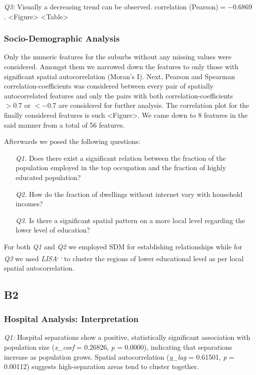 \documentclass[
	a4paper, %
	10pt, %
	unnumberedsections, %
	twoside, %
]{LTJournalArticle}
\begin{document}
\textit{Q3:} Visually a decreasing trend can be observed. correlation (Pearson)$= -0.6869$. <Figure> <Table>


\subsubsection{Socio-Demographic Analysis}
Only the numeric features for the suburbs without any missing values were considered. Amongst them we narrowed down the features to only those with significant spatial autocorrelation (Moran's I). Next, Pearson and Spearman correlation-coefficients was considered between every pair of spatially autocorrelated features and only the pairs with both correlation-coefficients  $>0.7$ or $<-0.7$ are considered for further analysis. The correlation plot for the finally considered features is such <Figure>. We came down to 8 features in the said manner from a total of 56 features.

Afterwards we posed the following questions:

\begin{enumerate}
  \item[\textit{Q1.}] Does there exist a significant relation between the fraction of the population employed in the top occupation and the fraction of highly educated population?
  \item[\textit{Q2.}] How do the fraction of dwellings without internet vary with household incomes?
  \item[\textit{Q3.}] Is there a significant spatial pattern on a more local level regarding the lower level of education? 
\end{enumerate}

For both \textit{Q1} and \textit{Q2} we employed SDM for establishing relationships while for \textit{Q3} we used \textit{LISA}\textsuperscript{\cite{Anselin1995}, \cite{darribasLab_05}, \cite{geodacenterLocalSpatial}} to cluster the regions of lower educational level as per local spatial autocorrelation.

\subsection{B2}

\subsubsection{Hospital Analysis: Interpretation}\leavevmode

\textit{Q1:} Hospital separations show a positive, statistically significant association with population size (\textit{x\_coef} = 0.26826, \textit{p} = 0.0000), indicating that separations increase as population grows. Spatial autocorrelation (\textit{y\_lag} = 0.61501, \textit{p} = 0.00112) suggests high-separation areas tend to cluster together.
\end{document}
